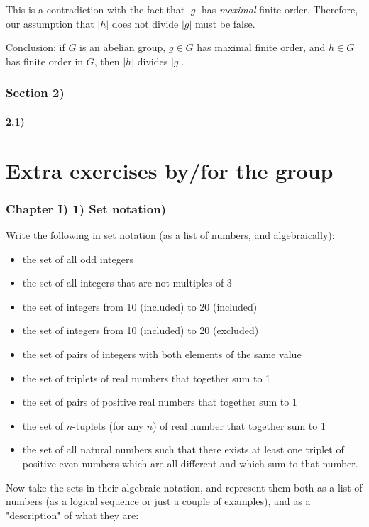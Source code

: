 \documentclass[12pt, letterpaper, twoside]{report}
\begin{document}
This is a contradiction with the fact that $|g|$ has \textit{maximal} finite order. Therefore, our assumption that $|h|$ does not divide $|g|$ must be false.

Conclusion: if $G$ is an abelian group, $g \in G$ has maximal finite order, and $h \in G$ has finite order in $G$, then $|h|$ divides $|g|$.
\section*{Section 2)}

\subsection*{2.1)}
\newpage
\part{Extra exercises by/for the group}

\section*{Chapter I) 1) Set notation)}

Write the following in set notation (as a list of numbers, and algebraically):
\begin{itemize}
	\item the set of all odd integers
	\item the set of all integers that are not multiples of 3
	\item the set of integers from 10 (included) to 20 (included)
	\item the set of integers from 10 (included) to 20 (excluded)
	\item the set of pairs of integers with both elements of the same value
	\item the set of triplets of real numbers that together sum to 1
	\item the set of pairs of positive real numbers that together sum to 1
	\item the set of $n$-tuplets (for any $n$) of real number that together sum to 1
	\item the set of all natural numbers such that there exists at least one triplet of positive even numbers which are all different and which sum to that number.
\end{itemize}

Now take the sets in their algebraic notation, and represent them both as a list of numbers (as a logical sequence or just a couple of examples), and as a "description" of what they are:
\end{document}
